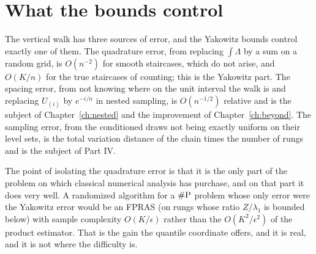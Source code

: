 \section{What the bounds control}

The vertical walk has three sources of error, and the Yakowitz bounds control exactly one of them. The quadrature error, from replacing $\int \Lambda$ by a sum on a random grid, is $O(n^{-2})$ for smooth staircases, which do not arise, and $O(K/n)$ for the true staircases of counting; this is the Yakowitz part. The spacing error, from not knowing where on the unit interval the walk is and replacing $U_{(i)}$ by $e^{-i/n}$ in nested sampling, is $O(n^{-1/2})$ relative and is the subject of Chapter~\ref{ch:nested} and the improvement of Chapter~\ref{ch:beyond}. The sampling error, from the conditioned draws not being exactly uniform on their level sets, is the total variation distance of the chain times the number of rungs and is the subject of Part IV.

The point of isolating the quadrature error is that it is the only part of the problem on which classical numerical analysis has purchase, and on that part it does very well. A randomized algorithm for a $\#\mathrm{P}$ problem whose only error were the Yakowitz error would be an FPRAS (on rungs whose ratio $Z / \lambda_1$ is bounded below) with sample complexity $O(K/\epsilon)$ rather than the $O(K^2/\epsilon^2)$ of the product estimator. That is the gain the quantile coordinate offers, and it is real, and it is not where the difficulty is.
